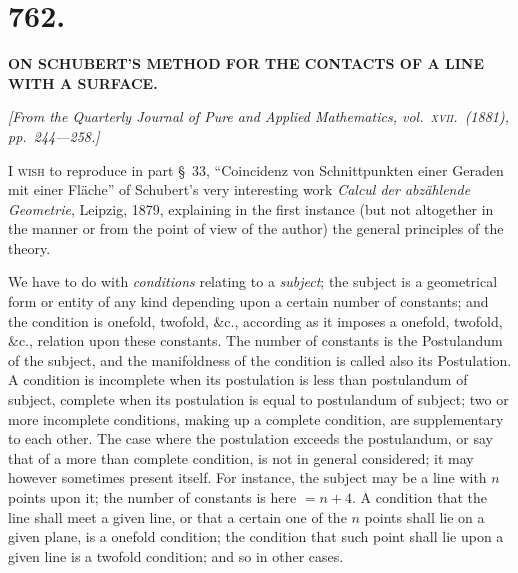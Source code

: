 \documentclass[11pt,a4paper,english]{article}
\theoremstyle{plain}
\begin{document}
\newpage

\section*{762.}

\begin{center}
\textbf{ON SCHUBERT'S METHOD FOR THE CONTACTS OF A LINE WITH A SURFACE.}
\end{center}

\noindent\textit{[From the \textit{Quarterly Journal of Pure and Applied Mathematics}, vol.\ \textsc{xvii}.\ (1881), pp.\ 244---258.]}

\vspace{\baselineskip}

I \textsc{wish} to reproduce in part \S\ 33, ``Coincidenz von Schnittpunkten einer Geraden mit einer Fl\"{a}che'' of Schubert's very interesting work \textit{Calcul der abz\"{a}hlende Geometrie}, Leipzig, 1879, explaining in the first instance (but not altogether in the manner or from the point of view of the author) the general principles of the theory.

We have to do with \textit{conditions} relating to a \textit{subject}; the subject is a geometrical form or entity of any kind depending upon a certain number of constants; and the condition is onefold, twofold, \&c., according as it imposes a onefold, twofold, \&c., relation upon these constants. The number of constants is the Postulandum of the subject, and the manifoldness of the condition is called also its Postulation. A condition is incomplete when its postulation is less than postulandum of subject, complete when its postulation is equal to postulandum of subject; two or more incomplete conditions, making up a complete condition, are supplementary to each other. The case where the postulation exceeds the postulandum, or say that of a more than complete condition, is not in general considered; it may however sometimes present itself. For instance, the subject may be a line with $n$ points upon it; the number of constants is here $= n + 4$. A condition that the line shall meet a given line, or that a certain one of the $n$ points shall lie on a given plane, is a onefold condition; the condition that such point shall lie upon a given line is a twofold condition; and so in other cases.
\end{document}
